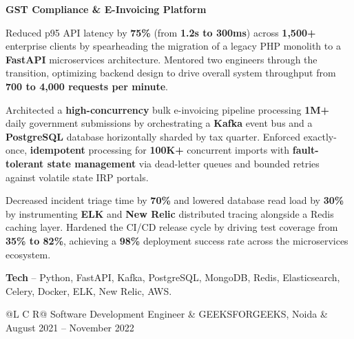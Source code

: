 \textcolor{Project}{\textbf{GST Compliance \& E-Invoicing Platform}}
\vspace{-0.88ex}
\begin{zitemize}
    \item Reduced p95 API latency by \textbf{75\%} (from \textbf{1.2s to 300ms}) across \textbf{1,500+} enterprise clients by spearheading the migration of a legacy PHP monolith to a \textbf{FastAPI} microservices architecture. Mentored two engineers through the transition, optimizing backend design to drive overall system throughput from \textbf{700 to 4,000 requests per minute}.
    \item Architected a \textbf{high-concurrency} bulk e-invoicing pipeline processing \textbf{1M+} daily government submissions by orchestrating a \textbf{Kafka} event bus and a \textbf{PostgreSQL} database horizontally sharded by tax quarter. Enforced exactly-once, \textbf{idempotent} processing for \textbf{100K+} concurrent imports with \textbf{fault-tolerant state management} via dead-letter queues and bounded retries against volatile state IRP portals.
    \item Decreased incident triage time by \textbf{70\%} and lowered database read load by \textbf{30\%} by instrumenting \textbf{ELK} and \textbf{New Relic} distributed tracing alongside a Redis caching layer. Hardened the CI/CD release cycle by driving test coverage from \textbf{35\% to 82\%}, achieving a \textbf{98\%} deployment success rate across the microservices ecosystem.
    \item \textbf{Tech} -- Python, FastAPI, Kafka, PostgreSQL, MongoDB, Redis, Elasticsearch, Celery, Docker, ELK, New Relic, AWS.
\end{zitemize}

\noindent
\begin{tabularx}{\textwidth}{@{}L C R@{}}
\textcolor{role}{Software Development Engineer} & \textcolor{company}{GEEKSFORGEEKS, Noida} & \textcolor{date}{August 2021 -- November 2022}\\
\end{tabularx}
\vspace{-1.6ex}

